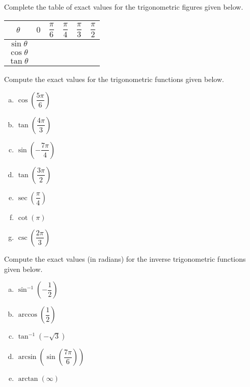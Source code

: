 \documentclass[12pt,letterpaper]{exam}
\begin{document}
\examtitle
{} 
\scores
\newpage

\begin{questions}

\newpage
\question[15] Complete the table of exact values for the trigonometric figures given below.
	{\def\arraystretch{3}
	\setlength{\tabcolsep}{2.5em}
	\begin{table}[!ht]
	\centering
	\begin{tabular}{|c||c|c|c|c|c|} \hline
	$\theta$ & $0$ & $\dfrac{\pi}{6}$ & $\dfrac{\pi}{4}$ & $\dfrac{\pi}{3}$ & $\dfrac{\pi}{2}$ \\ \hline \hline
	$\sin \theta$ &  &  &  &  &  \\ \hline
	$\cos \theta$ &  &  &  &  &  \\ \hline
	$\tan \theta$ &  &  &  &  &  \\ \hline
	\end{tabular}
	\end{table}
	}



\newpage
\question[15] Compute the exact values for the trigonometric functions given below.
	\begin{enumerate}[(a)]
	\item $\cos \!\left( \dfrac{5\pi}{6} \right)$
	\item $\tan \!\left( \dfrac{4\pi}{3} \right)$
	\item $\sin \!\left( -\dfrac{7\pi}{4} \right)$
	\item $\tan \!\left( \dfrac{3\pi}{2} \right)$
	\item $\sec \!\left( \dfrac{\pi}{4} \right)$
	\item $\cot \left( \pi \right)$
	\item $\csc \!\left( \dfrac{2\pi}{3} \right)$
	\end{enumerate}



\newpage
\question[10] Compute the exact values (in radians) for the inverse trigonometric functions given below.
	\begin{enumerate}[(a)]
	\item $\sin^{-1} \!\!\left( -\dfrac{1}{2} \right)$
	\item $\arccos \!\left( \dfrac{1}{2} \right)$
	\item $\tan^{-1} \!\left( -\sqrt{3} \right)$
	\item $\arcsin \!\left( \sin \left( \dfrac{7\pi}{6} \right) \right)$
	\item $\arctan(\infty)$
	\end{enumerate}
	



\end{questions}
\end{document}
